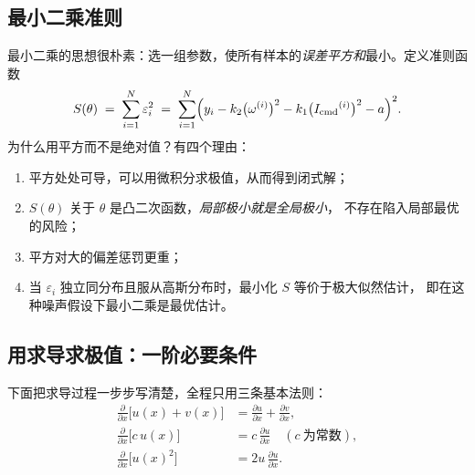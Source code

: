 \documentclass[cn,blue,11pt,device=normal]{elegantnote}
\newcommand{\Icmd}{I_{\mathrm{cmd}}{}}
\begin{document}
\subsection{最小二乘准则}

最小二乘的思想很朴素：选一组参数，使所有样本的\emph{误差平方和}最小。定义准则函数
\begin{equation}\label{eq:cost}
  S(\theta) \;=\; \sum_{i=1}^{N}\varepsilon_i^2
  \;=\;\sum_{i=1}^{N}\Bigl(y_i - k_2\bigl(\omega^{(i)}\bigr)^2 - k_1\bigl(\Icmd^{(i)}\bigr)^2 - a\Bigr)^{2}.
\end{equation}
为什么用平方而不是绝对值？有四个理由：
\begin{enumerate}
  \item 平方处处可导，可以用微积分求极值，从而得到闭式解；
  \item $S(\theta)$ 关于 $\theta$ 是凸二次函数，\emph{局部极小就是全局极小}，
  不存在陷入局部最优的风险；
  \item 平方对大的偏差惩罚更重；
  \item 当 $\varepsilon_i$ 独立同分布且服从高斯分布时，最小化 $S$ 等价于极大似然估计，
  即在这种噪声假设下最小二乘是最优估计。
\end{enumerate}

\subsection{用求导求极值：一阶必要条件}\label{sec:firstorder}

下面把求导过程一步步写清楚，全程只用三条基本法则：
\begin{align}
  \frac{\partial}{\partial x}\bigl[u(x)+v(x)\bigr] &= \frac{\partial u}{\partial x}+\frac{\partial v}{\partial x},\label{eq:rule1}\\
  \frac{\partial}{\partial x}\bigl[c\,u(x)\bigr] &= c\,\frac{\partial u}{\partial x}\quad(c\ \text{为常数}),\label{eq:rule2}\\
  \frac{\partial}{\partial x}\bigl[u(x)^2\bigr] &= 2u\,\frac{\partial u}{\partial x}.\label{eq:rule3}
\end{align}
\end{document}
